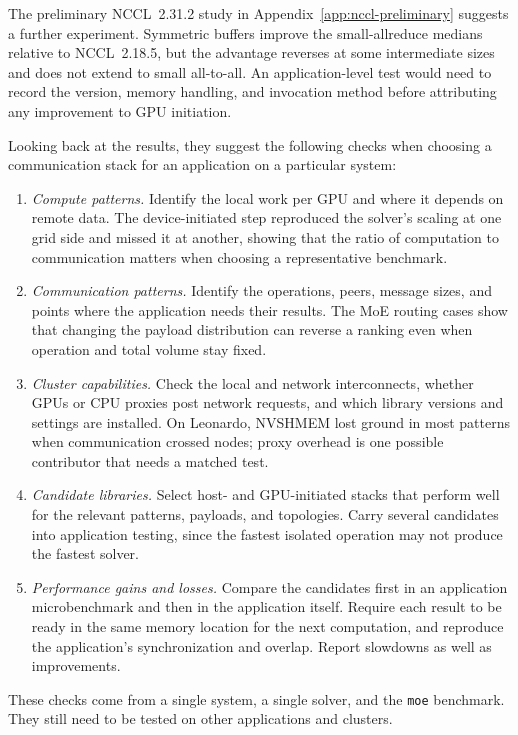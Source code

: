 The preliminary NCCL~2.31.2 study in Appendix~\ref{app:nccl-preliminary} suggests a further experiment. Symmetric buffers improve the small-allreduce medians relative to NCCL~2.18.5, but the advantage reverses at some intermediate sizes and does not extend to small all-to-all. An application-level test would need to record the version, memory handling, and invocation method before attributing any improvement to GPU initiation.

Looking back at the results, they suggest the following checks when choosing a communication stack for an application on a particular system:

\begin{enumerate}
    \item \emph{Compute patterns.} Identify the local work per GPU and where it depends on remote data. The device-initiated step reproduced the solver's scaling at one grid side and missed it at another, showing that the ratio of computation to communication matters when choosing a representative benchmark.
    \item \emph{Communication patterns.} Identify the operations, peers, message sizes, and points where the application needs their results. The MoE routing cases show that changing the payload distribution can reverse a ranking even when operation and total volume stay fixed.
    \item \emph{Cluster capabilities.} Check the local and network interconnects, whether GPUs or CPU proxies post network requests, and which library versions and settings are installed. On Leonardo, NVSHMEM lost ground in most patterns when communication crossed nodes; proxy overhead is one possible contributor that needs a matched test.
    \item \emph{Candidate libraries.} Select host- and GPU-initiated stacks that perform well for the relevant patterns, payloads, and topologies. Carry several candidates into application testing, since the fastest isolated operation may not produce the fastest solver.
    \item \emph{Performance gains and losses.} Compare the candidates first in an application microbenchmark and then in the application itself. Require each result to be ready in the same memory location for the next computation, and reproduce the application's synchronization and overlap. Report slowdowns as well as improvements.
\end{enumerate}

These checks come from a single system, a single solver, and the \texttt{moe} benchmark. They still need to be tested on other applications and clusters.

